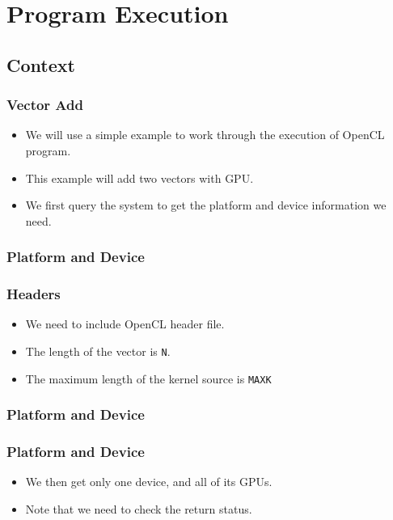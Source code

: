 \documentclass{beamer}
\begin{document}
\section{Program Execution}

\subsection{Context}

\begin{frame}
  \frametitle{Vector Add}
  \begin{itemize}
  \item We will use a simple example to work through the execution
    of OpenCL program.
  \item This example will add two vectors with GPU.
  \item We first query the system to get the platform and device
    information we need.
  \end{itemize}
\end{frame}

\begin{frame}
  \frametitle{Platform and Device}
\end{frame}

\begin{frame}
  \frametitle{Headers}
  \begin{itemize}
  \item We need to include OpenCL header file.
  \item The length of the vector is {\tt N}.
  \item The maximum length of the kernel source is {\tt MAXK}
  \end{itemize}
\end{frame}

\begin{frame}
  \frametitle{Platform and Device}
\end{frame}

\begin{frame}
  \frametitle{Platform and Device}
  \begin{itemize}
  \item We then get only one device, and all of its GPUs.
  \item Note that we need to check the return status.
  \end{itemize}
\end{frame}
\end{document}
